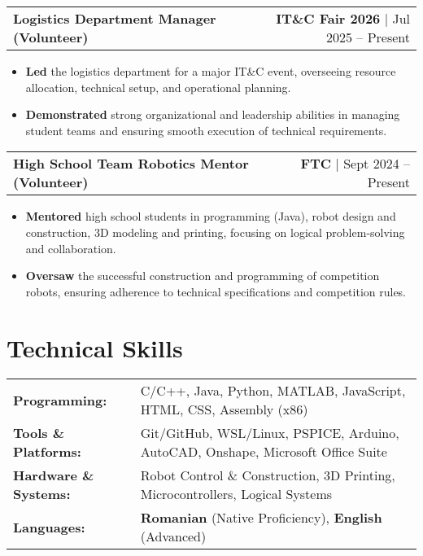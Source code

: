 \documentclass[a4paper,12pt]{article}
\makeatletter
\newenvironment{joblong}[2]
    {
    \begin{tabularx}{\linewidth}{@{}l X r@{}}
    \textbf{#1} & \hfill &  #2 \\[3.75pt]
    \end{tabularx}
    \begin{minipage}[t]{\linewidth}
    \begin{itemize}[nosep,after=\strut, leftmargin=1em, itemsep=3pt,label=--]
    }
    {
    \end{itemize}
    \end{minipage}    
    }
\makeatother
\begin{document}
\begin{joblong}{\textbf{Logistics Department Manager} (Volunteer)}{\textbf{IT\&C Fair 2026} | Jul 2025 – Present}
\item \textbf{Led} the logistics department for a major IT\&C event, overseeing resource allocation, technical setup, and operational planning.
\item \textbf{Demonstrated} strong organizational and leadership abilities in managing student teams and ensuring smooth execution of technical requirements.
\end{joblong}

\begin{joblong}{\textbf{High School Team Robotics Mentor} (Volunteer)}{\textbf{FTC} | Sept 2024 – Present}
\item \textbf{Mentored} high school students in programming (Java), robot design and construction, 3D modeling and printing, focusing on logical problem-solving and collaboration.
\item \textbf{Oversaw} the successful construction and programming of competition robots, ensuring adherence to technical specifications and competition rules.
\end{joblong}

\section{Technical Skills}
\begin{tabularx}{\linewidth}{@{}l X@{}}
\textbf{Programming:} & \normalsize{C/C++, Java, Python, MATLAB, JavaScript, HTML, CSS, Assembly (x86)} \\
\textbf{Tools \& Platforms:} & \normalsize{Git/GitHub, WSL/Linux, PSPICE, Arduino, AutoCAD, Onshape, Microsoft Office Suite} \\
\textbf{Hardware \& Systems:} & \normalsize{Robot Control \& Construction, 3D Printing, Microcontrollers, Logical Systems} \\
\textbf{Languages:} & \normalsize{\textbf{Romanian} (Native Proficiency), \textbf{English} (Advanced)}
\end{tabularx}

\end{document}
